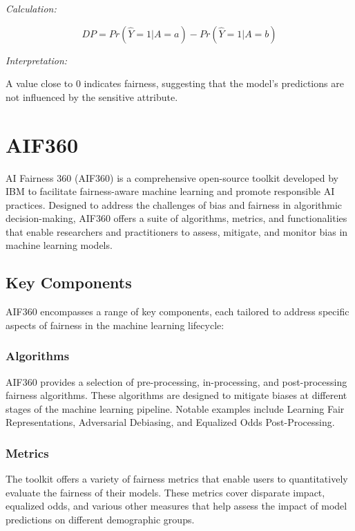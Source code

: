 \documentclass[12pt,a4paper,openright,twoside]{book}
\begin{document}
\emph{Calculation:}

\[ DP = Pr(\hat{Y} = 1|A = a) - Pr(\hat{Y} = 1|A = b) \]

\emph{Interpretation:}

A value close to 0 indicates fairness, suggesting that the model's predictions are not influenced by the sensitive attribute.

\newpage
\section{AIF360}

AI Fairness 360 (AIF360) is a comprehensive open-source toolkit developed by IBM to facilitate fairness-aware machine learning and promote responsible AI practices. Designed to address the challenges of bias and fairness in algorithmic decision-making, AIF360 offers a suite of algorithms, metrics, and functionalities that enable researchers and practitioners to assess, mitigate, and monitor bias in machine learning models.

\subsection{Key Components}

AIF360 encompasses a range of key components, each tailored to address specific aspects of fairness in the machine learning lifecycle:

\subsubsection{Algorithms}

AIF360 provides a selection of pre-processing, in-processing, and post-processing fairness algorithms. These algorithms are designed to mitigate biases at different stages of the machine learning pipeline. Notable examples include Learning Fair Representations, Adversarial Debiasing, and Equalized Odds Post-Processing.

\subsubsection{Metrics}

The toolkit offers a variety of fairness metrics that enable users to quantitatively evaluate the fairness of their models. These metrics cover disparate impact, equalized odds, and various other measures that help assess the impact of model predictions on different demographic groups.
\end{document}
